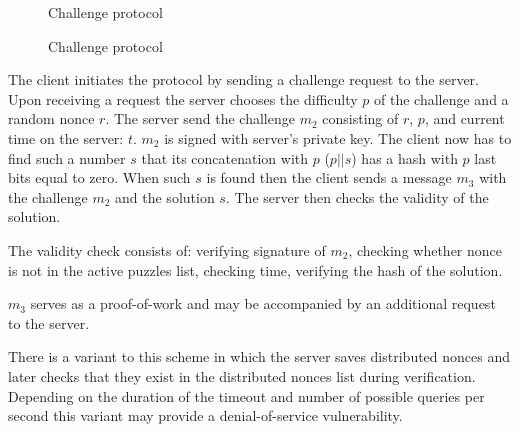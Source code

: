 \begin{figure}[tbp]
\begin{msc}{Challenge protocol}
\setlength{\instdist}{9cm}
\setlength{\envinstdist}{3cm}
\nextlevel
{}
\nextlevel[6]
\nextlevel[1]
\nextlevel[5]
\nextlevel
{}
\nextlevel[5]
\end{msc}
  \caption{Challenge protocol}
  \label{fig:chal_prot}
\end{figure}

The client initiates the protocol by sending a challenge request to the server. 
Upon receiving a request the server chooses the difficulty $p$ of the challenge
and a random nonce $r$. The server send the challenge $m_2$ consisting of $r$,
$p$, and current time on the server: $t$. $m_2$ is signed with server's private
key.  The client now has to find such a number $s$ that its concatenation with
$p$ ($p || s$) has a hash with $p$ last bits equal to zero. When such $s$ is
found then the client sends a message $m_3$ with the challenge $m_2$ and the
solution $s$. The server then checks the validity of the solution.

The validity check consists of: verifying signature of $m_2$, checking whether
nonce is not in the active puzzles list, checking time, verifying the hash of
the solution.

$m_3$ serves as a proof-of-work and may be accompanied by an additional request
to the server.

There is a variant to this scheme in which the server saves distributed nonces
and later checks that they exist in the distributed nonces list during
verification. Depending on the duration of the timeout and number of possible
queries per second this variant may provide a denial-of-service vulnerability.

